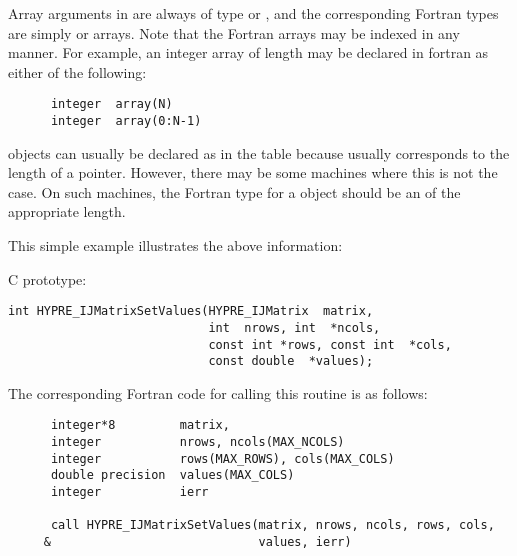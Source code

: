 Array arguments in \hypre{} are always of type  or , and the corresponding Fortran types are simply  or
 arrays.  Note that the Fortran arrays may be indexed in
any manner.  For example, an integer array of length  may be declared in
fortran as either of the following:
\begin{display}
\begin{verbatim}
      integer  array(N)
      integer  array(0:N-1)
\end{verbatim}
\end{display}

\hypre{} objects can usually be declared as in the table because
 usually corresponds to the length of a pointer.  However, there
may be some machines where this is not the case.  On such machines, the Fortran
type for a \hypre{} object should be an  of the appropriate
length.

This simple example illustrates the above information: 

C prototype:
\begin{display}
\begin{verbatim}
int HYPRE_IJMatrixSetValues(HYPRE_IJMatrix  matrix,
                            int  nrows, int  *ncols,
                            const int *rows, const int  *cols,
                            const double  *values);
\end{verbatim}
\end{display}

The corresponding Fortran code for calling this routine is as follows:
\begin{display}
\begin{verbatim}
      integer*8         matrix, 
      integer           nrows, ncols(MAX_NCOLS)
      integer           rows(MAX_ROWS), cols(MAX_COLS)
      double precision  values(MAX_COLS)
      integer           ierr

      call HYPRE_IJMatrixSetValues(matrix, nrows, ncols, rows, cols,
     &                             values, ierr)
\end{verbatim}
\end{display}
